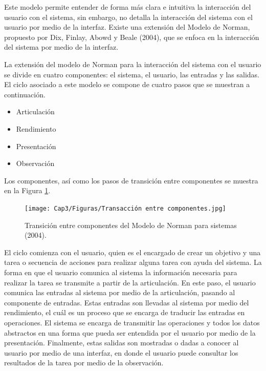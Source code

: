 Este modelo permite entender de forma más clara e intuitiva la interacción del usuario con el sistema, sin embargo, no detalla la interacción del sistema con el usuario por medio de la interfaz. Existe una extensión del Modelo de Norman, propuesto por Dix, Finlay, Abowd y Beale (2004), que se enfoca en la interacción del sistema por medio de la interfaz. 

La extensión del modelo de Norman para la interacción del sistema con el usuario se divide en cuatro componentes: el sistema, el usuario, las entradas y las salidas. El ciclo asociado a este modelo se compone de cuatro pasos que se muestran a continuación.

\begin{itemize}
  \item Articulación
  \item Rendimiento
  \item Presentación
  \item Observación
\end{itemize}

Los componentes, así como los pasos de transición entre componentes se muestra en la Figura \ref{fig:31}.

\begin{figure}[H]
  \centering
  \texttt{[image: Cap3/Figuras/Transacción entre componentes.jpg]}
  \caption{Transición entre componentes del Modelo de Norman para sistemas (2004).}
  \label{fig:31}
\end{figure}

El ciclo comienza con el usuario, quien es el encargado de crear un objetivo y una tarea o secuencia de acciones para realizar alguna tarea con ayuda del sistema. La forma en que el usuario comunica al sistema la información necesaria para realizar la tarea se transmite a partir de la articulación. En este paso, el usuario comunica las entradas al sistema por medio de la articulación, pasando al componente de entradas. Estas entradas son llevadas al sistema por medio del rendimiento, el cuál es un proceso que se encarga de traducir las entradas en operaciones. El sistema se encarga de transmitir las operaciones y todos los datos abstractos en una forma que pueda ser entendida por el usuario por medio de la presentación. Finalmente, estas salidas son mostradas o dadas a conocer al usuario por medio de una interfaz, en donde el usuario puede consultar los resultados de la tarea por medio de la observación.

